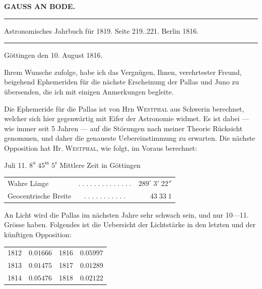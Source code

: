 \clearpage{}
\begin{center}\textbf{GAUSS AN BODE.}\par\vspace{4pt}\hrule\vspace{4pt}\fontsize{10}{12}\selectfont Astronomisches Jahrbuch für 1819. Seite 219..221. Berlin 1816.\par\vspace{4pt}\hrule\vspace{4pt}\end{center}
\begin{flushright}Göttingen den 10. August 1816.\end{flushright}

\par\indent Ihrem Wunsche zufolge, habe ich das Vergnügen, Ihnen, verehrtester Freund, beigehend Ephemeriden für die nächste Erscheinung der Pallas und Juno zu übersenden, die ich mit einigen Anmerkungen begleite.

\par\indent Die Ephemeride für die Pallas ist von Hrn \textsc{Westphal} aus Schwerin berechnet, welcher sich hier gegenwärtig mit Eifer der Astronomie widmet. Es ist dabei — wie immer seit 5 Jahren — auf die Störungen nach meiner Theorie Rücksicht genommen, und daher die genaueste Uebereinstimmung zu erwarten. Die nächste Opposition hat Hr. \textsc{Westphal}, wie folgt, im Voraus berechnet:
\begin{center}\fontsize{10}{12} Juli 11. $8^{\mathrm u}\;45^{\mathrm m}\;5^{\mathrm s}$ Mittlere Zeit in Göttingen\par
\setlength{\tabcolsep}{3pt}\begin{tabular}{lcr}
Wahre Länge & $.\;.\;.\;.\;.\;.\;.\;.\;.\;.\;.\;.\;.\;.$ & $289^\circ\;3'\;22''$\\
Geocentrische Breite & $.\;.\;.\;.\;.\;.\;.\;.\;.\;.\;.$ & $43\;33\;1$\\
\end{tabular}\end{center}

\par\indent An Licht wird die Pallas im nächsten Jahre sehr schwach sein, und nur 10—11. Grösse haben. Folgendes ist die Uebersicht der Lichtstärke in den letzten und der künftigen Opposition:
\begin{center}\fontsize{10}{12}\selectfont\setlength{\tabcolsep}{11pt}\begin{tabular}{lr|lr}
1812 & $0.01666$ & 1816 & $0.05997$\\
1813 & $0.01475$ & 1817 & $0.01289$\\
1814 & $0.05476$ & 1818 & $0.02122$\\
\end{tabular}\end{center}

